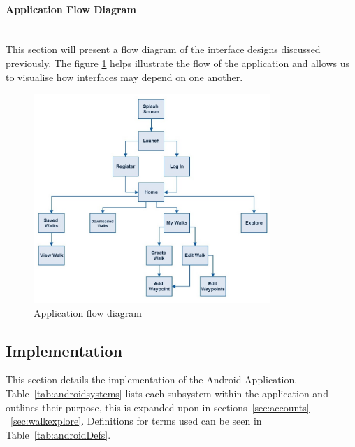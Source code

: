 \documentclass[11pt,a4paper]{report}
\begin{document}
\paragraph*{Application Flow Diagram}\mbox{}\\

This section will present a flow diagram of the interface designs discussed previously. The figure \ref{fig:flow} helps illustrate the flow of the application and allows us to visualise how interfaces may depend on one another.

\begin{figure}[H]
    \centering
    \includegraphics[width=0.8\textwidth]{chris/flow}
    \caption{Application flow diagram}
    \label{fig:flow}
\end{figure}

\subsection{Implementation}
This section details the implementation of the Android Application. Table~\ref{tab:androidsystems} lists each subsystem within the application and outlines their purpose, this is expanded upon in sections~\ref{sec:accounts} -~\ref{sec:walkexplore}. Definitions for terms used can be seen in Table~\ref{tab:androidDefs}.
\end{document}
